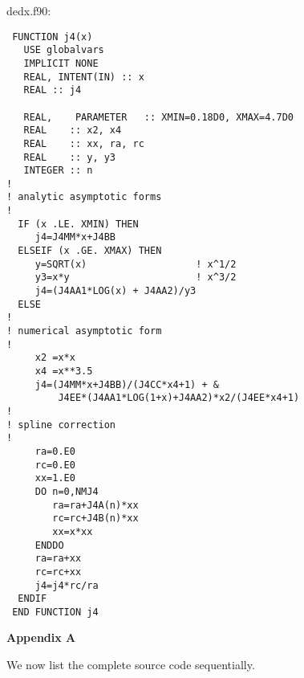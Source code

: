 \documentclass[preprint,12pt,eqsecnum,nofootinbib,amsmath,amssymb]{revtex4}
\begin{document}
{
\noindent
dedx.f90:
\baselineskip12pt
\begin{verbatim}
 FUNCTION j4(x)
   USE globalvars
   IMPLICIT NONE
   REAL, INTENT(IN) :: x
   REAL :: j4

   REAL,    PARAMETER   :: XMIN=0.18D0, XMAX=4.7D0
   REAL    :: x2, x4
   REAL    :: xx, ra, rc
   REAL    :: y, y3
   INTEGER :: n
!
! analytic asymptotic forms
!
  IF (x .LE. XMIN) THEN
     j4=J4MM*x+J4BB
  ELSEIF (x .GE. XMAX) THEN
     y=SQRT(x)                   ! x^1/2
     y3=x*y                      ! x^3/2
     j4=(J4AA1*LOG(x) + J4AA2)/y3
  ELSE 
!
! numerical asymptotic form 
!
     x2 =x*x
     x4 =x**3.5
     j4=(J4MM*x+J4BB)/(J4CC*x4+1) + &
         J4EE*(J4AA1*LOG(1+x)+J4AA2)*x2/(J4EE*x4+1)
!
! spline correction
! 
     ra=0.E0
     rc=0.E0
     xx=1.E0
     DO n=0,NMJ4
        ra=ra+J4A(n)*xx
        rc=rc+J4B(n)*xx
        xx=x*xx
     ENDDO
     ra=ra+xx
     rc=rc+xx
     j4=j4*rc/ra
  ENDIF
 END FUNCTION j4
\end{verbatim}
}

\pagebreak
\centerline{\bf Appendix A}
\vskip0.3cm 

We now list the complete source code sequentially. 
\end{document}
